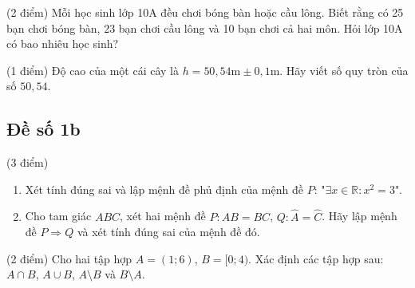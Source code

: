 \begin{bt}%
	(2 điểm) 		
	Mỗi học sinh lớp 10A đều chơi bóng bàn hoặc cầu lông. Biết rằng có 25 bạn chơi bóng bàn, 23 bạn chơi cầu lông và 10 bạn chơi cả hai môn. Hỏi lớp 10A có bao nhiêu học sinh?
\end{bt}

	\begin{bt}%
	(1 điểm) 		Độ cao của một cái cây là $h=50,54 \mathrm{m}\pm 0,1 \mathrm{m}$. Hãy viết số quy tròn của số $50,54$.
\end{bt}	

\subsection{Đề số 1b}
\setcounter{bt}{0}
\begin{bt}%
	(3 điểm) 		
	\begin{enumerate}
		\item Xét tính đúng sai và lập mệnh đề phủ định của mệnh đề $P$: "$\exists x\in \mathbb{R}: x^2=3$".
		\item Cho tam giác $ABC$, xét hai mệnh đề $P: AB=BC$, $Q: \widehat{A}=\widehat{C}$. Hãy lập mệnh đề $P\Rightarrow Q$ và xét tính đúng sai của mệnh đề đó.
	\end{enumerate}
\end{bt}

\begin{bt}%
	(2 điểm) 		
	Cho hai tập hợp $A=(1;6)$, $B=[0;4)$. Xác định các tập hợp sau: $A\cap B$, $A\cup B$, $A\setminus B$ và $B\setminus A$.
	\loigiai{$A\cap B=(1;4)$, $A\cup B=[0;6)$, $A\setminus B=[4;6)$, $B\setminus A=[0;1]$.
	}
\end{bt}

